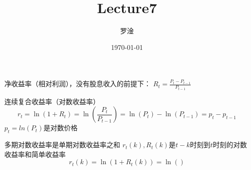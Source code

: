 \documentclass[12pt, a4paper, oneside]{ctexart}
\title{Lecture7}
\author{罗淦}
\date{\today}
\begin{document}
\maketitle
\tableofcontents
\newpage
净收益率（相对利润），没有股息收入的前提下：
$R_t=\frac{P_t-P_{t-1}}{P_{t-1}}$

连续复合收益率（对数收益率）
$$r_t=\ln(1+R_t)=\ln(\frac{P_t}{P_{t-1}})=\ln(P_t)-\ln(P_{t-1})=p_t-p_{t-1}$$
$p_t=ln(P_t)$是对数价格

多期对数收益率是单期对数收益率之和
$r_t(k), R_t(k)$是$t-k$时刻到$t$时刻的对数收益率和简单收益率
$$r_t(k)=\ln(1+R_t(k))=\ln()$$
\end{document}

